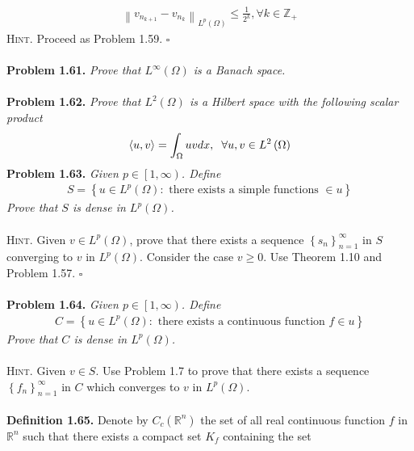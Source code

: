 \documentclass[a4paper]{article}
\numberwithin{equation}{section}
\begin{document}
\begin{align}
{\left\| {{v_{{n_{k + 1}}}} - {v_{{n_k}}}} \right\|_{{L^p}\left( \Omega  \right)}} \le \frac{1}{{{2^k}}},\forall k \in {\mathbb{Z}_ + }
\end{align}
\textsc{Hint.} Proceed as Problem 1.59. \hfill $\square$\\
\\
\textbf{Problem 1.61.} \textit{Prove that $L^\infty \left(\Omega\right)$ is a Banach space.}\\
\\
\textbf{Problem 1.62.} \textit{Prove that $L^2\left(\Omega\right)$ is a Hilbert space with the following scalar product}
\begin{align}
\left\langle {u,v} \right\rangle  = \int_\Omega  {uvdx} ,\hspace{0.2cm}\forall u,v \in {L^2}\left( \Omega  \right)
\end{align}
\textbf{Problem 1.63.} \textit{Given $p\in \left[1,\infty\right)$. Define}
\begin{align}
S = \left\{ {u \in {L^p}\left( \Omega  \right):\mbox{ there exists a simple functions }\in u} \right\}
\end{align}
\textit{Prove that $S$ is dense in $L^p\left(\Omega\right)$.}\\
\\
\textsc{Hint.} Given $v\in L^p\left(\Omega\right)$, prove that there exists a sequence $\left\{ {{s_n}} \right\}_{n = 1}^\infty $ in $S$ converging to $v$ in $L^p\left(\Omega\right)$. Consider the case $v\ge 0$. Use Theorem 1.10 and Problem 1.57. \hfill $\square$\\
\\
\textbf{Problem 1.64.} \textit{Given $p\in \left[1,\infty\right)$. Define}
\begin{align}
C = \left\{ {u \in {L^p}\left( \Omega  \right):\mbox{ there exists a continuous function } f \in u} \right\}
\end{align}
\textit{Prove that $C$ is dense in $L^p\left(\Omega\right)$.}\\
\\
\textsc{Hint.} Given $v\in S$. Use Problem 1.7 to prove that there exists a sequence $\left\{ {{f_n}} \right\}_{n = 1}^\infty $ in $C$ which converges to $v$ in $L^p\left(\Omega\right)$.\\
\\
\textbf{Definition 1.65.} Denote by $C_c\left(\mathbb{R}^n\right)$ the set of all real continuous function $f$ in $\mathbb{R}^n$ such that there exists a compact set $K_f$ containing the set
\end{document}

